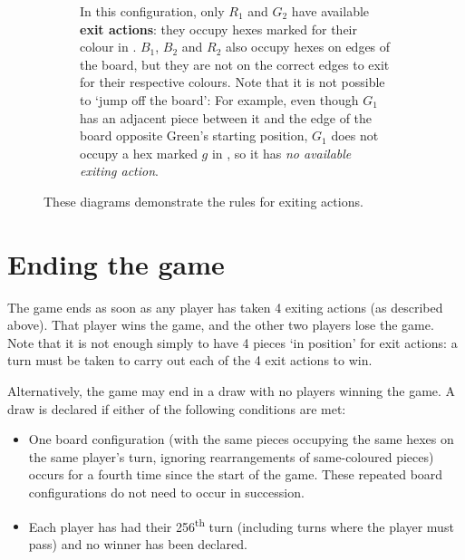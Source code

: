 \documentclass[]{article}
\begin{document}
\begin{figure}[ht!]
\begin{subfigure}{.62\textwidth}
\begin{tikzpicture}
    \end{tikzpicture}
    \caption{\label{fig:exit-eg}
        In this configuration, only $R_1$ and $G_2$ have available
        \textbf{exit actions}:
        they occupy hexes marked for their colour in .
        $B_1$, $B_2$ and $R_2$ also occupy hexes on edges of the board,
        but they are not on the correct edges to exit for their respective
        colours. Note that it is not possible to `jump off the board': For
        example, even though $G_1$ has an adjacent piece between it and the
        edge of the board opposite Green's starting position, $G_1$ does not
        occupy a hex marked $g$ in , so it has \emph{no
        available exiting action}.
    }
\end{subfigure}
\caption{\label{fig:exit}
    These diagrams demonstrate the rules for exiting actions.
}
\end{figure}

\section*{Ending the game}

The game ends as soon as any player has taken 4 exiting actions (as
described above). That player wins the game, and the other two players
lose the game. Note that it is not enough simply to have 4 pieces `in
position' for exit actions: a turn must be taken to carry out each of
the 4 exit actions to win.

Alternatively, the game may end in a draw with no players winning the
game. A draw is declared if either of the following conditions are met:

\begin{itemize}
\item
  One board configuration (with the same pieces occupying the same hexes
  on the same player's turn, ignoring rearrangements of same-coloured
  pieces) occurs for a fourth time since the start of the game. These
  repeated board configurations do not need to occur in succession.
\item
  Each player has had their 256\textsuperscript{th} turn (including
  turns where the player must pass) and no winner has been declared.
\end{itemize}
\end{document}

